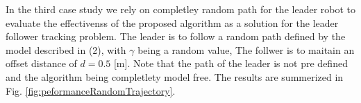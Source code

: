 \documentclass[conference]{IEEEtran}
\begin{document}
 


In the third case study we rely on completley random path for the leader robot to evaluate the effectivenss of the proposed algorithm as a solution for the leader follower tracking problem. The leader is to follow a random path defined by the model described in (2), with $\gamma$ being a random value, The follwer is to maitain an offset distance of $d = 0.5 $ [m]. Note that the path of the leader is not pre defined and the algorithm being completlety model free. The results are summerized in Fig. \ref{fig:peformanceRandomTrajectory}. %
\end{document}
